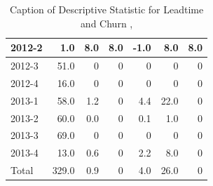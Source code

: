 \documentclass[UKenglish]{ifimaster}  %
\begin{document}
\begin{table}[!htbp]
\begin{adjustwidth}{-1.5cm}{}
{{\begin{tabular}{ | l | r | r | r | r | r | r | }
2012-2 & 1.0 & 8.0 & 8.0 & -1.0 & 8.0 & 8.0\\ \hline
2012-3 & 51.0 & 0 & 0 & 0 & 0 & 0\\ \hline
2012-4 & 16.0 & 0 & 0 & 0 & 0 & 0\\ \hline
2013-1 & 58.0 & 1.2 & 0 & 4.4 & 22.0 & 0\\ \hline
2013-2 & 60.0 & 0.0 & 0 & 0.1 & 1.0 & 0\\ \hline
2013-3 & 69.0 & 0 & 0 & 0 & 0 & 0\\ \hline
2013-4 & 13.0 & 0.6 & 0 & 2.2 & 8.0 & 0\\ \hline
Total & 329.0 & 0.9 & 0 & 4.0 & 26.0 & 0\\ \hline

\end{tabular}
}
}
\end{adjustwidth}
\caption[Optional caption for list of figures]{Caption of Descriptive Statistic for Leadtime and Churn  , }
\label{DS:8:3}
\end{table}
\end{document}
